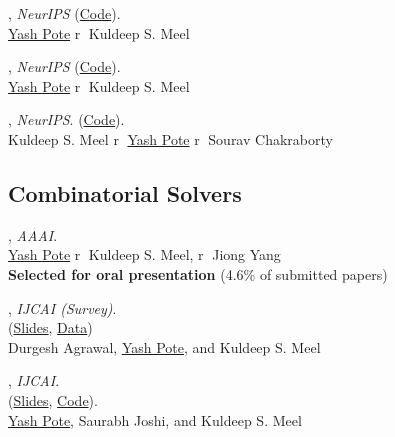 \documentclass[12pt,letterpaper]{report}
\begin{document}
\begin{tablist}
		\item[2022] ,  \textit{NeurIPS} (\href{https://github.com/meelgroup/barbarik}{Code}).\\
		\underline{Yash Pote}  \textcircled{r} Kuldeep S. Meel
		
		\item[2021] ,  \textit{NeurIPS} (\href{https://github.com/meelgroup/teq}{Code}).\\
		\underline{Yash Pote}  \textcircled{r} Kuldeep S. Meel
		
		\item[2020] , \textit{NeurIPS}. (\href{https://github.com/meelgroup/barbarik}{Code}).\\
		Kuldeep S. Meel  \textcircled{r} \underline{Yash Pote}  \textcircled{r} Sourav Chakraborty
		
	\end{tablist}
	
	\subsection*{Combinatorial Solvers}
	
	\begin{tablist}
		\item[2025] , \textit{AAAI}.\\
		\underline{Yash Pote}  \textcircled{r} Kuldeep S. Meel, \textcircled{r} Jiong Yang\\
		\textbf{Selected for  oral presentation}  (4.6\% of submitted papers)
		
		\item[2021] ,  \textit{IJCAI (Survey)}. \\
		(\href{https://meelgroup.github.io/publication/ijcai21_partition}{Slides}, \href{https://doi.org/10.5281/zenodo.4769117}{Data})\\
		Durgesh Agrawal, \underline{Yash Pote}, and Kuldeep S. Meel
		
		\item[2019] , \textit{IJCAI}.\\ (\href{https://meelgroup.github.io/files/slides/ijcai19pjm.pdf}{Slides},  \href{https://github.com/meelgroup/1-CARD-XOR/}{Code}).\\
		\underline{Yash Pote}, Saurabh Joshi, and Kuldeep S. Meel
		
	\end{tablist}
\end{document}
